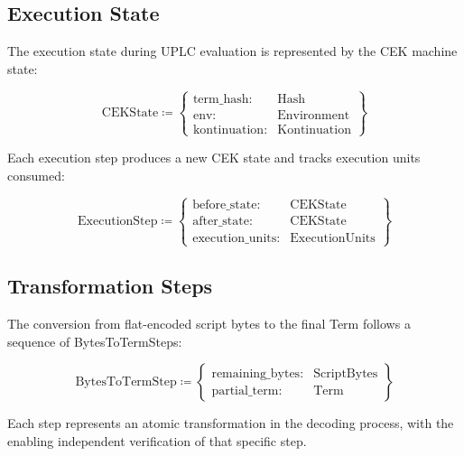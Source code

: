 \documentclass[../midgard.tex]{subfiles}
\begin{document}
\subsection{Execution State}

The execution state during UPLC evaluation is represented by the CEK machine state:

\begin{equation*}
    \text{CEKState} \coloneq \left\{
    \begin{array}{ll}
        \text{term\_hash} : & \text{Hash} \\
        \text{env} : & \text{Environment} \\
        \text{kontinuation} : & \text{Kontinuation}
    \end{array} \right\}
\end{equation*}

Each execution step produces a new CEK state and tracks execution units consumed:

\begin{equation*}
    \text{ExecutionStep} \coloneq \left\{
    \begin{array}{ll}
        \text{before\_state} : & \text{CEKState} \\
        \text{after\_state} : & \text{CEKState} \\
        \text{execution\_units} : & \text{ExecutionUnits}
    \end{array} \right\}
\end{equation*}

\subsection{Transformation Steps}

The conversion from flat-encoded script bytes to the final Term follows a sequence of BytesToTermSteps:

\begin{equation*}
    \text{BytesToTermStep} \coloneq \left\{
    \begin{array}{ll}
        \text{remaining\_bytes} : & \text{ScriptBytes} \\
        \text{partial\_term} : & \text{Term}
    \end{array} \right\}
\end{equation*}

Each step represents an atomic transformation in the decoding process, with the  enabling independent verification of that specific step.
\end{document}
